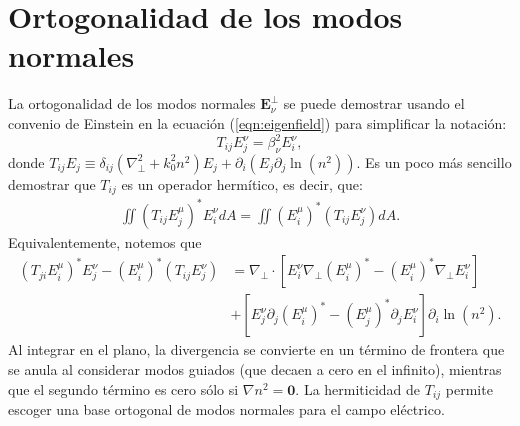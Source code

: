 \chapter{Ortogonalidad de los modos normales \label{sec:orto}}

La ortogonalidad de los modos normales $\textbf{E}_\nu^\perp$ se puede demostrar usando el convenio de Einstein en la ecuación (\ref{eqn:eigenfield}) para simplificar la notación:
\begin{equation}
	T_{ij} E^\nu_j = \beta_\nu^2 E^\nu_i, \label{eqn:eigentensorial}
\end{equation}
donde $T_{ij}E_j \equiv \delta_{ij}\left(\nabla_\perp^2 + k_0^2n^2\right)E_j+\partial_i \left(E_j  \partial_j\ln(n^2) \right) $. Es un poco más sencillo demostrar que $T_{ij}$ es un operador hermítico, es decir, que:
\begin{align*}
	\iint \left(T_{ij} E_j^\mu \right)^*  E_i^\nu dA = \iint \left( E_i^\mu \right)^*  \left(T_{ij} E_j^\nu\right) dA .
\end{align*}
Equivalentemente, notemos que
\begin{align*}
	\left(T_{ji} E_i^\mu \right)^* E_j^\nu  - \left( E_i^\mu \right)^*  \left(T_{ij} E_j^\nu \right) &= \nabla_\perp \cdot \left[E_i^\nu \nabla_\perp \left( E_i^\mu \right)^* - \left( E_i^\mu \right)^* \nabla_\perp E_i^\nu \right] 
	\\	
	&+ \left[E^\nu_j \partial_j \left( E_i^\mu \right)^*  - \left( E_j^\mu \right)^* \partial_j  E_i^\nu \right] \partial_i \ln(n^2).  
\end{align*}
Al integrar en el plano, la divergencia se convierte en un término de frontera que se anula al considerar modos guiados (que decaen a cero en el infinito), mientras que el segundo término es cero sólo si $\nabla n^2 = \textbf{0}$. La hermiticidad de $T_{ij}$ permite escoger una base ortogonal de modos normales para el campo eléctrico.